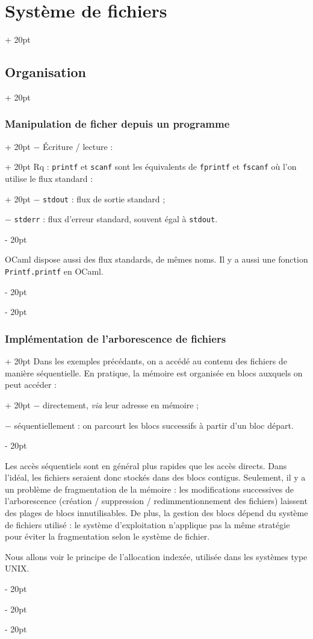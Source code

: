 \documentclass[a4paper, 12pt, twoside]{article}
\newcommand{\ind}[1][20pt]{\advance\leftskip + #1}
\newcommand{\deind}[1][20pt]{\advance\leftskip - #1}
\newenvironment{indentedenv}[1][20pt]{\par \ind[#1]}{\par \deind}
\newenvironment{indt}[2][20pt]{#2 \begin{indentedenv}[#1]}{\end{indentedenv}} %
\begin{document}
\begin{indt}{\section{Système de fichiers}}
\begin{indt}{\subsection{Organisation}}
\begin{indt}{\subsubsection{Manipulation de ficher depuis un programme}}
\begin{indt}{$-$ \'Ecriture / lecture :}
\begin{indt}{Rq : \texttt{printf} et \texttt{scanf} sont les équivalents de \texttt{fprintf} et \texttt{fscanf} où l'on utilise le flux standard :}
                        $-$ \texttt{stdout} : flux de sortie standard ;
                        
                        $-$ \texttt{stderr} : flux d'erreur standard, souvent égal à \texttt{stdout}.
                    \end{indt}
                    
                    \vspace{6pt}
                    
                    OCaml dispose aussi des flux standards, de mêmes noms. Il y a aussi une fonction \texttt{Printf.printf} en OCaml.
                \end{indt}
            \end{indt}
            
            \vspace{6pt}
            
            \begin{indt}{\subsubsection{Implémentation de l'arborescence de fichiers}}
                \begin{indt}{Dans les exemples précédants, on a accédé au contenu des fichiers de manière séquentielle. En pratique, la mémoire est organisée en blocs auxquels on peut accéder :}
                    $-$ directement, \textit{via} leur adresse en mémoire ;
                    
                    $-$ séquentiellement : on parcourt les blocs successifs à partir d'un bloc départ.
                \end{indt}
                
                \vspace{6pt}
                
                Les accès séquentiels sont en général plus rapides que les accès directs. Dans l'idéal, les fichiers seraient donc stockés dans des blocs contigus. Seulement, il y a un problème de fragmentation de la mémoire : les modifications successives de l'arborescence (création / suppression / redimmentionnement des fichiers) laissent des plages de blocs innutilisables. De plus, la gestion des blocs dépend du système de fichiers utilisé : le système d'exploitation n'applique pas la même stratégie pour éviter la fragmentation selon le système de fichier.
                
                Nous allons voir le principe de l'allocation indexée, utilisée dans les systèmes type UNIX.
                

\end{indt}
\end{indt}
\end{indt}
\end{document}
